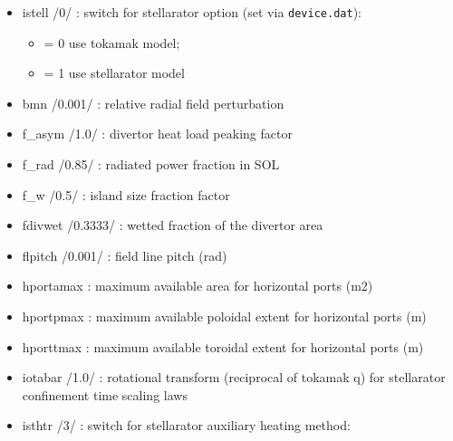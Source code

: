 \documentclass[]{article}
\providecommand{\tightlist}{%
  \setlength{\itemsep}{0pt}\setlength{\parskip}{0pt}}
\begin{document}
\begin{itemize}
  \begin{itemize}
  \tightlist
  \item
    istell /0/ : switch for stellarator option (set via
    \texttt{device.dat}):

    \begin{itemize}
    \tightlist
    \item
      = 0 use tokamak model;
    \item
      = 1 use stellarator model
    \end{itemize}
  \item
    bmn /0.001/ : relative radial field perturbation
  \item
    f\_asym /1.0/ : divertor heat load peaking factor
  \item
    f\_rad /0.85/ : radiated power fraction in SOL
  \item
    f\_w /0.5/ : island size fraction factor
  \item
    fdivwet /0.3333/ : wetted fraction of the divertor area
  \item
    flpitch /0.001/ : field line pitch (rad)
  \item
    hportamax : maximum available area for horizontal ports (m2)
  \item
    hportpmax : maximum available poloidal extent for horizontal ports
    (m)
  \item
    hporttmax : maximum available toroidal extent for horizontal ports
    (m)
  \item
    iotabar /1.0/ : rotational transform (reciprocal of tokamak q) for
    stellarator confinement time scaling laws
  \item
    isthtr /3/ : switch for stellarator auxiliary heating method:


\end{itemize}
\end{itemize}
\end{document}
